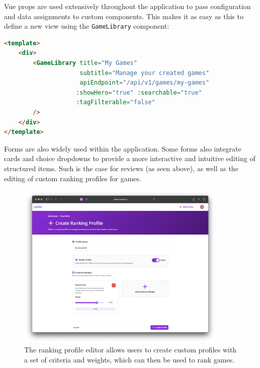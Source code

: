 \documentclass[11pt,italian,a4paper]{article}
\begin{document}
Vue props are used extensively throughout the application to pass configuration and data assignments to custom components. This makes it as easy as this to define a new view using the \texttt{GameLibrary} component:

\begin{lstlisting}[language=HTML]
<template>
    <div>
        <GameLibrary title="My Games"
                     subtitle="Manage your created games"
                     apiEndpoint="/api/v1/games/my-games"
                    :showHero="true" :searchable="true"
                    :tagFilterable="false"
        />
    </div>
</template>
\end{lstlisting}

Forms are also widely used within the application. Some forms also integrate cards and choice dropdowns to provide a more interactive and intuitive editing of structured items. Such is the case for reviews (as seen above), as well as the editing of custom ranking profiles for games.

\begin{figure}[H]
    \centering
    \includegraphics[width=0.9\textwidth,trim={0 1cm 0 1cm}]{figures/rank_profile.png}
    \caption{The ranking profile editor allows users to create custom profiles with a set of criteria and weights, which can then be used to rank games.}
\end{figure}
\end{document}
